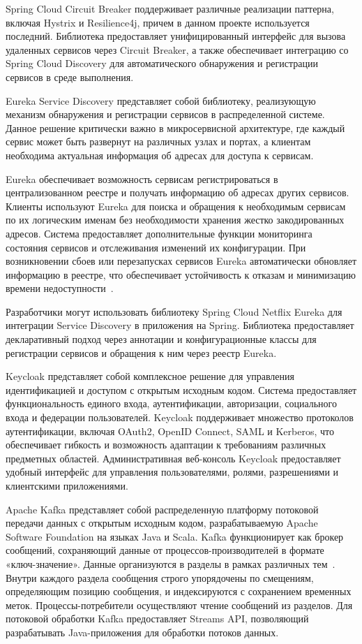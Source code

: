 Spring Cloud Circuit Breaker поддерживает различные реализации паттерна, включая Hystrix и Resilience4j, причем в данном проекте используется последний. Библиотека предоставляет унифицированный интерфейс для вызова удаленных сервисов через Circuit Breaker, а также обеспечивает интеграцию со Spring Cloud Discovery для автоматического обнаружения и регистрации сервисов в среде выполнения.

Eureka Service Discovery представляет собой библиотеку, реализующую механизм обнаружения и регистрации сервисов в распределенной системе. Данное решение критически важно в микросервисной архитектуре, где каждый сервис может быть развернут на различных узлах и портах, а клиентам необходима актуальная информация об адресах для доступа к сервисам.

Eureka обеспечивает возможность сервисам регистрироваться в централизованном реестре и получать информацию об адресах других сервисов.
Клиенты используют Eureka для поиска и обращения к необходимым сервисам по их логическим именам без необходимости хранения жестко закодированных адресов. Система предоставляет дополнительные функции мониторинга состояния сервисов и отслеживания изменений их конфигурации. При возникновении сбоев или перезапусках сервисов Eureka автоматически обновляет информацию в реестре, что обеспечивает устойчивость к отказам и минимизацию времени недоступности~\cite{13_davis2020}.

Разработчики могут использовать библиотеку Spring Cloud Netflix Eureka для интеграции Service Discovery в приложения на Spring.
Библиотека предоставляет декларативный подход через аннотации и конфигурационные классы для регистрации сервисов и обращения к ним через реестр Eureka.

Keycloak представляет собой комплексное решение для управления идентификацией и доступом с открытым исходным кодом.
Система предоставляет функциональность единого входа, аутентификации, авторизации, социального входа и федерации пользователей.
Keycloak поддерживает множество протоколов аутентификации, включая OAuth2, OpenID Connect, SAML и Kerberos, что обеспечивает гибкость и возможность адаптации к требованиям различных предметных областей. Административная веб-консоль Keycloak предоставляет удобный интерфейс для управления пользователями, ролями, разрешениями и клиентскими приложениями.

Apache Kafka представляет собой распределенную платформу потоковой передачи данных с открытым исходным кодом, разрабатываемую Apache Software Foundation на языках Java и Scala.
Kafka функционирует как брокер сообщений, сохраняющий данные от процессов-производителей в формате «ключ-значение».
Данные организуются в разделы в рамках различных тем~\cite{14_niya2019}. Внутри каждого раздела сообщения строго упорядочены по смещениям, определяющим позицию сообщения, и индексируются с сохранением временных меток.
Процессы-потребители осуществляют чтение сообщений из разделов.
Для потоковой обработки Kafka предоставляет Streams API, позволяющий разрабатывать Java-приложения для обработки потоков данных.


